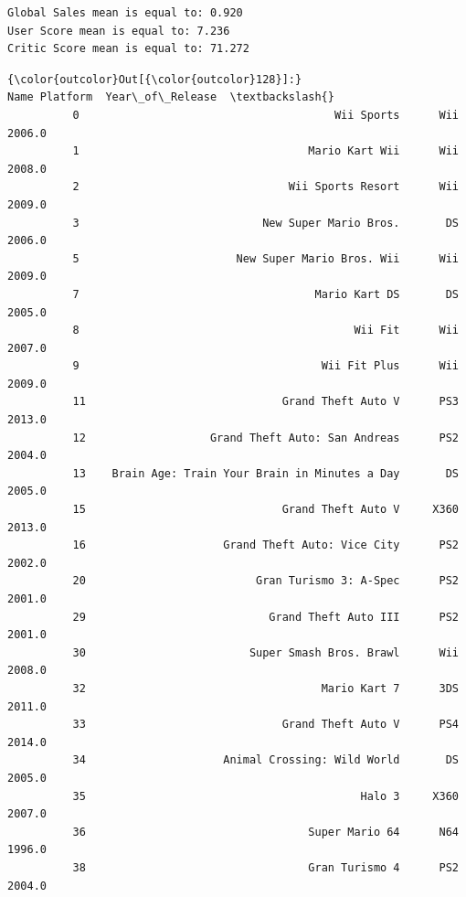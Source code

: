\documentclass[11pt]{article}
\begin{document}
    \begin{Verbatim}[commandchars=\\\{\}]
Global Sales mean is equal to: 0.920
User Score mean is equal to: 7.236
Critic Score mean is equal to: 71.272

    \end{Verbatim}

\begin{Verbatim}[commandchars=\\\{\}]
{\color{outcolor}Out[{\color{outcolor}128}]:}                                               Name Platform  Year\_of\_Release  \textbackslash{}
          0                                       Wii Sports      Wii           2006.0   
          1                                   Mario Kart Wii      Wii           2008.0   
          2                                Wii Sports Resort      Wii           2009.0   
          3                            New Super Mario Bros.       DS           2006.0   
          5                        New Super Mario Bros. Wii      Wii           2009.0   
          7                                    Mario Kart DS       DS           2005.0   
          8                                          Wii Fit      Wii           2007.0   
          9                                     Wii Fit Plus      Wii           2009.0   
          11                              Grand Theft Auto V      PS3           2013.0   
          12                   Grand Theft Auto: San Andreas      PS2           2004.0   
          13    Brain Age: Train Your Brain in Minutes a Day       DS           2005.0   
          15                              Grand Theft Auto V     X360           2013.0   
          16                     Grand Theft Auto: Vice City      PS2           2002.0   
          20                          Gran Turismo 3: A-Spec      PS2           2001.0   
          29                            Grand Theft Auto III      PS2           2001.0   
          30                         Super Smash Bros. Brawl      Wii           2008.0   
          32                                    Mario Kart 7      3DS           2011.0   
          33                              Grand Theft Auto V      PS4           2014.0   
          34                     Animal Crossing: Wild World       DS           2005.0   
          35                                          Halo 3     X360           2007.0   
          36                                  Super Mario 64      N64           1996.0   
          38                                  Gran Turismo 4      PS2           2004.0   

\end{Verbatim}
\end{document}
